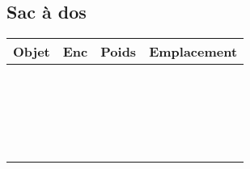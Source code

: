 \documentclass[10pt,a4paper]{article}
\begin{document}
\begin{multicols}{3}
\subsection*{Sac à dos}
\begin{tabular}{cccc}
\textbf{Objet}&\textbf{Enc}&\textbf{Poids}&\textbf{Emplacement}\\
\hline\\
\hline\\
\hline\\
\hline\\
\hline\\
\hline\\
\hline\\
\hline\\
\hline\\
\hline\\
\hline\\
\hline\\
\hline\\
\hline\\
\hline\\
\hline\\
\hline\\
\hline\\
\hline\\
\hline\\
\end{tabular}
\end{multicols}
\end{document}
